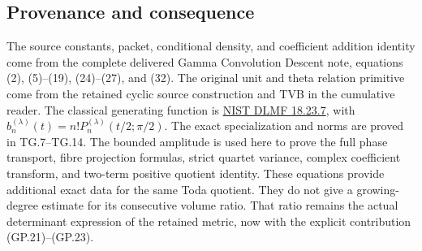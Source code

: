 \subsection{Provenance and consequence}
The source constants, packet, conditional density, and coefficient
addition identity come from the complete delivered Gamma Convolution
Descent note, equations (2), (5)--(19), (24)--(27), and (32).
The original unit and theta relation primitive come from the retained
cyclic source construction and TVB in the cumulative reader. The
classical generating function is
\href{https://dlmf.nist.gov/18.23.E7}{NIST DLMF 18.23.7}, with
$b_n^{(\lambda)}(t)=n!P_n^{(\lambda)}(t/2;\pi/2)$.
The exact specialization and norms are proved in TG.7--TG.14.
The bounded amplitude is used here to prove the full phase transport,
fibre projection formulas, strict quartet variance, complex coefficient
transform, and two-term positive quotient identity. These equations
provide additional exact data for the same Toda quotient. They do not
give a growing-degree estimate for its consecutive volume ratio.
That ratio remains the actual determinant expression of the retained
metric, now with the explicit contribution (GP.21)--(GP.23).

\endgroup
